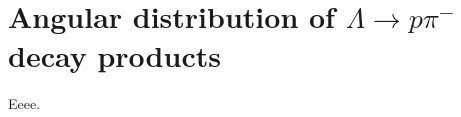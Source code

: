 \chapter{Angular distribution of \texorpdfstring{$\Lambda \rightarrow p\pi^-$}{Lambda to proton-pion} decay products}

Eeee.
